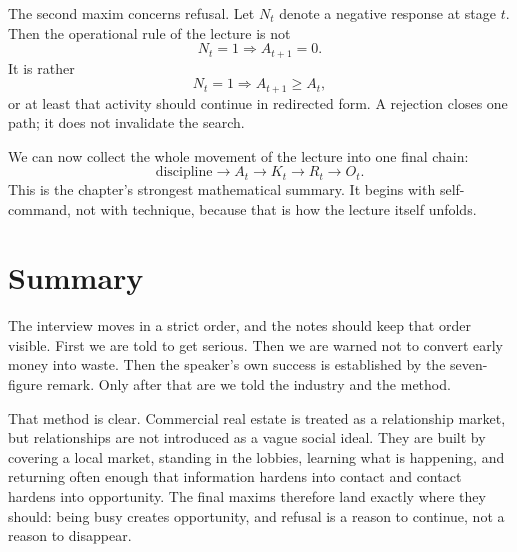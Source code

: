 The second maxim concerns refusal. Let \(N_t\) denote a negative response at stage \(t\). Then the operational rule of the lecture is not
\[
N_t = 1 \Longrightarrow A_{t+1} = 0.
\]
It is rather
\begin{equation}
N_t = 1 \Longrightarrow A_{t+1} \ge A_t,
\end{equation}
or at least that activity should continue in redirected form. A rejection closes one path; it does not invalidate the search.

We can now collect the whole movement of the lecture into one final chain:
\begin{equation}
\text{discipline} \to A_t \to K_t \to R_t \to O_t.
\end{equation}
This is the chapter's strongest mathematical summary. It begins with self-command, not with technique, because that is how the lecture itself unfolds.

\section{Summary}

The interview moves in a strict order, and the notes should keep that order visible. First we are told to get serious. Then we are warned not to convert early money into waste. Then the speaker's own success is established by the seven-figure remark. Only after that are we told the industry and the method.

That method is clear. Commercial real estate is treated as a relationship market, but relationships are not introduced as a vague social ideal. They are built by covering a local market, standing in the lobbies, learning what is happening, and returning often enough that information hardens into contact and contact hardens into opportunity. The final maxims therefore land exactly where they should: being busy creates opportunity, and refusal is a reason to continue, not a reason to disappear.